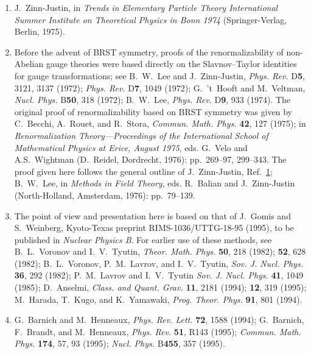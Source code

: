 \begin{enumerate}
  \item {}\label{ch17-ref-1}
  J.~Zinn-Justin, in \textit{Trends in Elementary Particle Theory International Summer Institute on Theoretical Physics in Bonn 1974} (Springer-Verlag, Berlin, 1975).

  \item {}\label{ch17-ref-2}
  Before the advent of BRST symmetry, proofs of the renormalizability of non-Abelian gauge theories were based directly on the Slavnov--Taylor identities for gauge transformations; see B.~W.~Lee and J.~Zinn-Justin, \textit{Phys. Rev.} D\textbf{5}, 3121, 3137 (1972); \textit{Phys. Rev.} D\textbf{7}, 1049 (1972); G.~'t~Hooft and M.~Veltman, \textit{Nucl. Phys.} B\textbf{50}, 318 (1972); B.~W.~Lee, \textit{Phys. Rev.} D\textbf{9}, 933 (1974). The original proof of renormalizability based on BRST symmetry was given by C.~Becchi, A.~Rouet, and R.~Stora, \textit{Commun. Math. Phys.} \textbf{42}, 127 (1975); in \textit{Renormalization Theory---Proceedings of the International School of Mathematical Physics at Erice, August 1975}, eds. G.~Velo and A.S.~Wightman (D.~Reidel, Dordrecht, 1976): pp.~269--97, 299--343. The proof given here follows the general outline of J.~Zinn-Justin, Ref.~\hyperref[ch17-ref-1]{1}; B.~W.~Lee, in \textit{Methods in Field Theory}, eds. R.~Balian and J.~Zinn-Justin (North-Holland, Amsterdam, 1976): pp.~79--139.

  \item {}\label{ch17-ref-3}
  The point of view and presentation here is based on that of J.~Gomis and S.~Weinberg, Kyoto-Texas preprint RIMS-1036/UTTG-18-95 (1995), to be published in \textit{Nuclear Physics B}. For earlier use of these methods, see B.~L.~Voronov and I.~V.~Tyutin, \textit{Theor. Math. Phys.} \textbf{50}, 218 (1982); \textbf{52}, 628 (1982); B.~L.~Voronov, P.~M.~Lavrov, and I.~V.~Tyutin, \textit{Sov. J. Nucl. Phys.} \textbf{36}, 292 (1982); P.~M.~Lavrov and I.~V.~Tyutin \textit{Sov. J. Nucl. Phys.} \textbf{41}, 1049 (1985); D.~Anselmi, \textit{Class. and Quant. Grav.} \textbf{11}, 2181 (1994); \textbf{12}, 319 (1995); M.~Harada, T.~Kugo, and K.~Yamawaki, \textit{Prog. Theor. Phys.} \textbf{91}, 801 (1994).

  \item {}\label{ch17-ref-4}
  G.~Barnich and M.~Henneaux, \textit{Phys. Rev. Lett.} \textbf{72}, 1588 (1994); G.~Barnich, F.~Brandt, and M.~Henneaux, \textit{Phys. Rev.} \textbf{51}, R143 (1995); \textit{Commun. Math. Phys.} \textbf{174}, 57, 93 (1995); \textit{Nucl. Phys.} B\textbf{455}, 357 (1995).


\end{enumerate}
